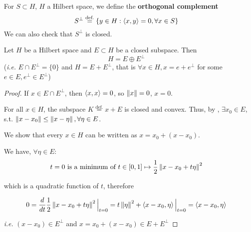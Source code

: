 \documentclass{article}
\begin{document}
\begin{definition}\nextline
	For $S\subset H$, $H$ a Hilbert space, we define the \textbf{orthogonal complement}
	$$
		S^{\perp} \overset{\text{def.}}{=} \left\{y \in H: \left<{x},{y}\right>=0, \forall x \in S \right\}
	$$
	We can also check that $S^{\perp}$ is closed.
\end{definition}


\begin{corollary} \nextline
	Let $H$ be a Hilbert space and $E \subset H$ be a closed subspace. Then
	$$
		H = E \oplus E^{\perp}
	$$
	(\textit{i.e.} $E \cap E^{\perp} = \{0\}$ and $H = E + E^{\perp}$, that is $\forall x \in H, x=e+ e^{\perp}$ for some $e \in E, e^{\perp} \in E^{\perp}$)
\end{corollary}

\begin{proof}
	If $x \in E\cap E^{\perp}$, then $\left<{x},{x}\right>=0$, so $\left\|{x}\right\|=0$, $x=0$.

	For all $x\in H$, the subspace $K\overset{\text{def.}}{=}x+E$ is closed and convex.
	Thus, by , $\exists x_0 \in E$, s.t. $\left\|{x-x_0}\right\| \leq \left\|{x-\eta}\right\|, \forall \eta \in E$.
	\begin{unexaminable}
		We show that every $x\in H$ can be written as $x=x_0+(x-x_0)$.
	\end{unexaminable}

	We have, $\forall \eta \in E$:
	\begin{equation*}
		t=0 \text{\ is\ a\ minimum\ of\ } t\in [0,1] \mapsto \frac{1}{2} \left\|{x-x_0+t\eta}\right\|^2
	\end{equation*}

	which is a quadratic function of $t$, therefore

	\begin{equation*}
		0=\frac{d}{dt}\frac{1}{2} \left\|{x-x_0+t\eta}\right\|^2 \Big|_{t=0} = t\left\|{\eta}\right\|^2 + \left<{x-x_0},{\eta}\right> \Big|_{t=0}=\left<{x-x_0},{\eta}\right>
	\end{equation*}

	\textit{i.e.} $(x-x_0) \in E^{\perp}$ and $x=x_0+(x-x_0) \in E+E^{\perp}$
\end{proof}
\end{document}
